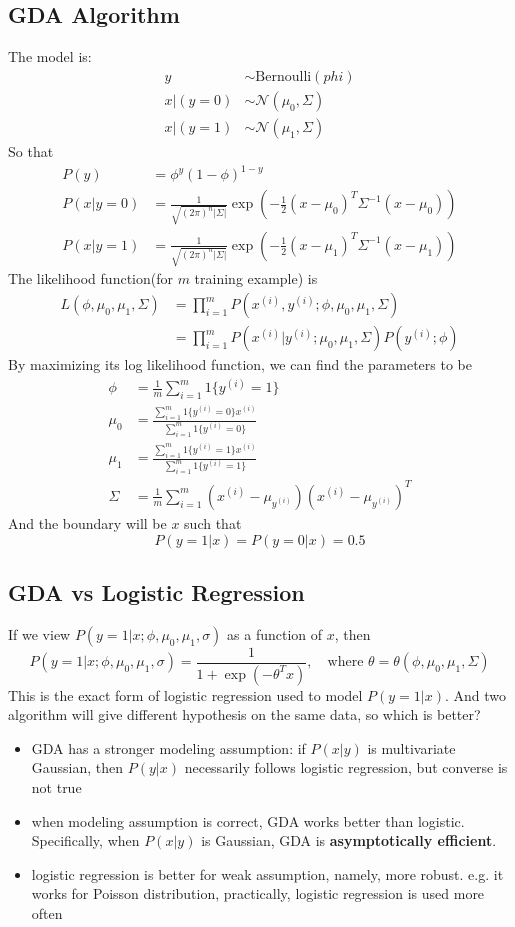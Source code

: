 \documentclass[10pt,a4paper,oneside]{article}
\begin{document}
\subsection{GDA Algorithm}
The model is:
\begin{align*}
y &\sim \text{Bernoulli}(phi)\\
x|(y=0) &\sim \mathcal{N}(\mu_0, \Sigma)\\
x|(y=1) &\sim \mathcal{N}(\mu_1, \Sigma)
\end{align*}
So that
\begin{align*}
P(y) &= \phi^y (1-\phi)^{1-y}\\
P(x|y=0) &= \frac{1}{\sqrt{(2\pi)^n|\Sigma|}} \exp \left(-\frac{1}{2}(x-\mu_0)^T \Sigma^{-1}(x-\mu_0)\right)\\
P(x|y=1) &=  \frac{1}{\sqrt{(2\pi)^n|\Sigma|}} \exp \left(-\frac{1}{2}(x-\mu_1)^T \Sigma^{-1}(x-\mu_1)\right)
\end{align*}
The likelihood function(for $m$ training example) is
\begin{align*}
L(\phi, \mu_0, \mu_1, \Sigma) &= \prod_{i=1}^{m}P(x^{(i)}, y^{(i)}; \phi, \mu_0, \mu_1, \Sigma)\\
&= \prod_{i=1}^{m}P(x^{(i)}|y^{(i)}; \mu_0, \mu_1, \Sigma) P(y^{(i)};\phi)
\end{align*}
By maximizing its log likelihood function, we can find the parameters to be
\begin{align*}
\phi &= \frac{1}{m} \sum_{i=1}^{m} 1\{y^{(i)}=1\} \\
\mu_0 &= \frac{\sum_{i=1}^{m} 1\{y^{(i)}=0\}x^{(i)}}{\sum_{i=1}^{m} 1\{y^{(i)}=0\}}\\
\mu_1 &= \frac{\sum_{i=1}^{m} 1\{y^{(i)}=1\}x^{(i)}}{\sum_{i=1}^{m} 1\{y^{(i)}=1\}}\\
\Sigma &= \frac{1}{m} \sum_{i=1}^{m} (x^{(i)} - \mu_{y^{(i)}}) (x^{(i)} - \mu_{y^{(i)}})^T
\end{align*}
And the boundary will be $x$ such that
\[
P(y=1|x) = P(y=0|x) = 0.5
\]

\subsection{GDA vs Logistic Regression}
If we view $P(y=1|x; \phi, \mu_0,\mu_1, \sigma)$ as a function of $x$, then
\[
P(y=1|x; \phi, \mu_0,\mu_1, \sigma) = \frac{1}{1+\exp(-\theta^T x)}, \quad \text{where } \theta = \theta(\phi, \mu_0,\mu_1, \Sigma)
\]
This is the exact form of logistic regression used to model $P(y=1|x)$. And two algorithm will give different hypothesis on the same data, so which is better?
\begin{itemize}
	\item GDA has a stronger modeling assumption: if $P(x|y)$ is multivariate Gaussian, then $P(y|x)$ necessarily follows logistic regression, but converse is not true
	\item when modeling assumption is correct, GDA works better than logistic. Specifically, when $P(x|y)$ is Gaussian, GDA is \textbf{asymptotically efficient}.
	\item logistic regression is better for weak assumption, namely, more robust. e.g. it works for Poisson distribution, practically, logistic regression is used more often
\end{itemize}
\end{document}
